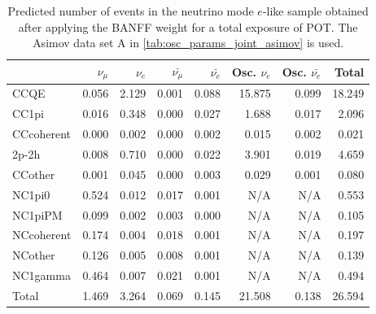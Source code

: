 
\begin{table}
\center
\begin{tabular} { | l ||r | r | r | r | r | r | | r | }
\hline
              & $\nu_\mu$            & $\nu_e$              & $\bar{\nu_\mu}$      & $\bar{\nu_e}$        & Osc. $\nu_e$         & Osc. $\bar{\nu_e}$   & Total                \\ \hline\hline
 CCQE         & 0.056                & 2.129                & 0.001                & 0.088                & 15.875               & 0.099                & 18.249               \\ \hline
 CC1pi        & 0.016                & 0.348                & 0.000                & 0.027                & 1.688                & 0.017                & 2.096                \\ \hline
 CCcoherent   & 0.000                & 0.002                & 0.000                & 0.002                & 0.015                & 0.002                & 0.021                \\ \hline
 2p-2h         & 0.008                & 0.710                & 0.000                & 0.022                & 3.901                & 0.019                & 4.659                \\ \hline
 CCother      & 0.001                & 0.045                & 0.000                & 0.003                & 0.029                & 0.001                & 0.080                \\ \hline
 NC1pi0       & 0.524                & 0.012                & 0.017                & 0.001                & N/A                  & N/A                  & 0.553                \\ \hline
 NC1piPM      & 0.099                & 0.002                & 0.003                & 0.000                & N/A                  & N/A                  & 0.105                \\ \hline
 NCcoherent   & 0.174                & 0.004                & 0.018                & 0.001                & N/A                  & N/A                  & 0.197                \\ \hline
 NCother      & 0.126                & 0.005                & 0.008                & 0.001                & N/A                  & N/A                  & 0.139                \\ \hline
 NC1gamma     & 0.464                & 0.007                & 0.021                & 0.001                & N/A                  & N/A                  & 0.494                \\ \hline
\hline
 Total        & 1.469                & 3.264                & 0.069                & 0.145                & 21.508               & 0.138                & 26.594               \\ \hline

\end{tabular}
\caption{
Predicted number of events in the neutrino mode $e$-like sample
obtained after applying the BANFF weight
for a total exposure of \TotalPotNu{} POT.
The Asimov data set A in \cref{tab:osc_params_joint_asimov} is used.
}
\label{tab:events_1re_Asimov_A}
\end{table}



